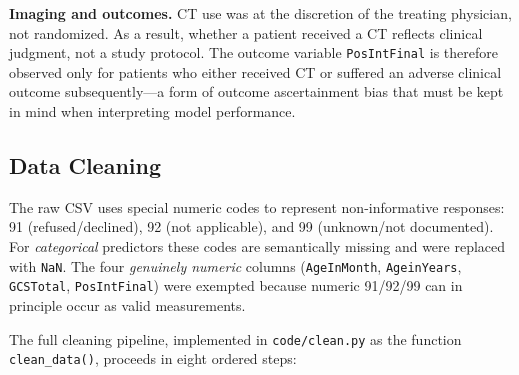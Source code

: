 \documentclass[10pt,letterpaper]{article}
\begin{document}
\textbf{Imaging and outcomes.}  CT use was at the discretion of the treating physician,
not randomized.
As a result, whether a patient received a CT reflects clinical judgment, not a study protocol.
The outcome variable \texttt{PosIntFinal} is therefore observed only for patients who either
received CT or suffered an adverse clinical outcome subsequently---a form of outcome ascertainment
bias that must be kept in mind when interpreting model performance.

\subsection{Data Cleaning}
\label{data-cleaning}

The raw CSV uses special numeric codes to represent non-informative responses: 91 (refused/declined),
92 (not applicable), and 99 (unknown/not documented).
For \emph{categorical} predictors these codes are semantically missing and were replaced with
\texttt{NaN}.
The four \emph{genuinely numeric} columns (\texttt{AgeInMonth}, \texttt{AgeinYears},
\texttt{GCSTotal}, \texttt{PosIntFinal}) were exempted because numeric 91/92/99 can in principle
occur as valid measurements.

The full cleaning pipeline, implemented in \texttt{code/clean.py} as the function
\texttt{clean\_data()}, proceeds in eight ordered steps:
\end{document}
